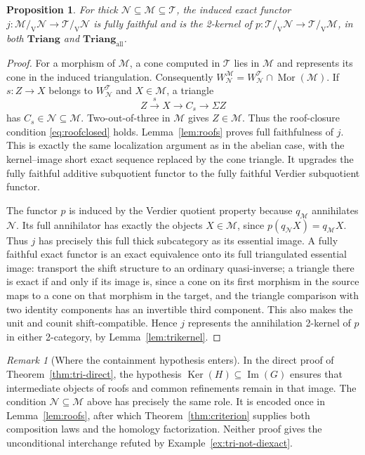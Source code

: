 \documentclass[11pt,reqno,a4paper]{amsart}
\newtheorem{proposition}[theorem]{Proposition}
\theoremstyle{definition}
\theoremstyle{remark}
\newtheorem{remark}[theorem]{Remark}
\newcommand{\M}{\mathcal{M}}
\newcommand{\N}{\mathcal{N}}
\newcommand{\T}{\mathcal{T}}
\newcommand{\0}{\mathbf{0}}
\renewcommand{\1}{\mathbf{1}}
\newcommand{\Triang}{\mathbf{Triang}}
\newcommand{\Tri}{\Triang}
\newcommand{\TriAll}{\mathbf{Triang}_{\mathrm{all}}}
\newcommand{\vq}[2]{#1/_{\!\mathrm V}#2}
\DeclareMathOperator{\Mor}{Mor}
\DeclareMathOperator{\Ker}{Ker}
\begin{document}
\begin{proposition}\label{prop:Verdiernested}
For thick $\N\subseteq\M\subseteq\T$, the induced exact functor
$j:\vq{\M}{\N}\to\vq{\T}{\N}$ is fully faithful and is the
2-kernel of $p:\vq{\T}{\N}\to\vq{\T}{\M}$, in both $\Tri$
and $\TriAll$.
\end{proposition}
\begin{proof}
For a morphism of $\M$, a cone computed in $\T$ lies in $\M$
and represents its cone in the induced triangulation. Consequently
$W_{\N}^{\M}=W_{\N}^{\T}\cap\Mor(\M)$. If $s:Z\to X$ belongs
to $W_{\N}^{\T}$ and $X\in\M$, a triangle
\[
 Z\xrightarrow{s}X\longrightarrow C_s\longrightarrow\Sigma Z
\]
has $C_s\in\N\subseteq\M$. Two-out-of-three in $\M$ gives
$Z\in\M$. Thus the roof-closure condition \eqref{eq:roofclosed}
holds. Lemma~\ref{lem:roofs} proves full faithfulness of $j$.
This is exactly the same localization argument as in the abelian case,
with the kernel--image short exact sequence replaced by the cone triangle.
It upgrades the fully faithful additive subquotient functor to the
fully faithful Verdier subquotient functor.

The functor $p$ is induced by the Verdier quotient property because
$q_{\M}$ annihilates $\N$. Its full annihilator has exactly the
objects $X\in\M$, since $p(q_{\N}X)=q_{\M}X$.
Thus $j$ has precisely this full thick subcategory as its essential image.
A fully faithful exact functor is an exact equivalence onto its full
triangulated essential image: transport the shift structure to an
ordinary quasi-inverse; a triangle there is exact if and only
if its image is, since a cone on its first morphism in the source
maps to a cone on that morphism in the target, and the triangle
comparison with two identity components has an invertible third
component. This also makes the unit and counit shift-compatible.
Hence $j$ represents the annihilation 2-kernel of $p$ in either
2-category, by Lemma~\ref{lem:trikernel}.
\end{proof}

\begin{remark}[Where the containment hypothesis enters]
In the direct proof of Theorem~\ref{thm:tri-direct}, the hypothesis
\(\Ker(H)\subseteq\operatorname{Im}(G)\) ensures that intermediate
objects of roofs and common refinements remain in that image.
The condition \(\N\subseteq\M\) above has precisely the same role.
It is encoded once in Lemma~\ref{lem:roofs}, after which
Theorem~\ref{thm:criterion} supplies both composition laws and the
homology factorization. Neither proof gives the unconditional
interchange refuted by Example~\ref{ex:tri-not-diexact}.
\end{remark}
\end{document}
